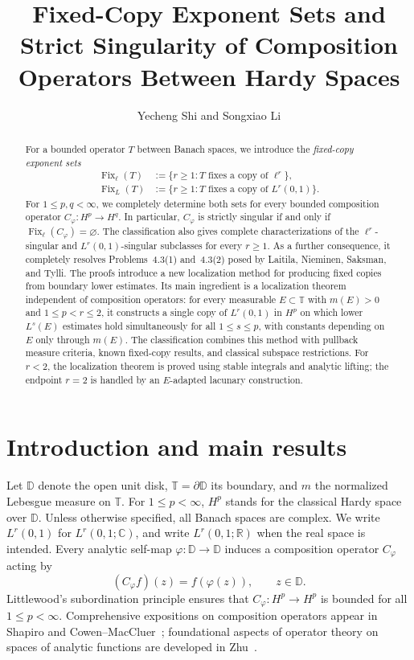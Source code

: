 \documentclass[11pt, reqno]{amsart}
\title[Fixed-Copy Exponents and Strict Singularity]
{Fixed-Copy Exponent Sets and Strict Singularity of Composition Operators Between Hardy Spaces}
\author[Y. Shi and S. Li]{Yecheng Shi and Songxiao Li}
\theoremstyle{definition}
\theoremstyle{remark}
\newcommand{\D}{\mathbb{D}}
\newcommand{\T}{\mathbb{T}}
\newcommand{\C}{\mathbb{C}}
\newcommand{\R}{\mathbb{R}}
\begin{document}
\begin{abstract}
For a bounded operator \(T\) between Banach spaces, we introduce the
\emph{fixed-copy exponent sets}
\[
\begin{aligned}
\operatorname{Fix}_{\ell}(T)
&:=
\{r\ge1:T\text{ fixes a copy of }\ell^r\},\\
\operatorname{Fix}_{L}(T)
&:=
\{r\ge1:T\text{ fixes a copy of }L^r(0,1)\}.
\end{aligned}
\]
For \(1\le p,q<\infty\), we completely determine both sets for every
bounded composition operator \(C_\varphi:H^p\to H^q\). In particular,
\(C_\varphi\) is strictly singular if and only if
\(\operatorname{Fix}_{\ell}(C_\varphi)=\varnothing\).
The classification also gives complete characterizations of the
\(\ell^r\)-singular and \(L^r(0,1)\)-singular subclasses for every
\(r\ge1\). As a further consequence, it completely resolves
Problems~4.3\textup{(1)} and~4.3\textup{(2)} posed by Laitila,
Nieminen, Saksman, and Tylli.
The proofs introduce a new localization method for producing fixed
copies from boundary lower estimates. Its main ingredient is a
localization theorem independent of composition operators: for every
measurable \(E\subset\mathbb T\) with \(m(E)>0\) and
\(1\le p<r\le2\), it constructs a single copy of \(L^r(0,1)\) in
\(H^p\) on which lower \(L^s(E)\) estimates hold simultaneously for
all \(1\le s\le p\), with constants depending on \(E\) only through
\(m(E)\). The classification combines this method with pullback
measure criteria, known fixed-copy results, and classical subspace
restrictions. For \(r<2\), the localization theorem is proved using
stable integrals and analytic lifting; the endpoint \(r=2\) is
handled by an \(E\)-adapted lacunary construction.
\end{abstract}
\maketitle

\section{Introduction and main results}
\label{sec:intro}


Let \(\D\) denote the open unit disk, \(\T=\partial\D\) its boundary,
and \(m\) the normalized Lebesgue measure on \(\T\). For $1\le p<\infty$, $H^{p}$
stands for the classical Hardy space over $\D$. 
Unless otherwise specified, all Banach spaces are complex.
We write \(L^r(0,1)\) for \(L^r(0,1;\C)\), and write
\(L^r(0,1;\R)\) when the real space is intended.
Every analytic self-map
$\varphi:\D\to\D$ induces a composition operator $C_{\varphi}$ acting by
\[
(C_{\varphi}f)(z)=f(\varphi(z)),\qquad z\in\D.
\]
Littlewood's subordination principle ensures that
$C_{\varphi}:H^{p}\to H^{p}$ is bounded for all $1\le p<\infty$.
Comprehensive expositions on composition operators appear in Shapiro \cite{Shapiro1993} 
and Cowen--MacCluer~\cite{CowenMacCluer1995}; foundational aspects of operator theory on spaces of
analytic functions are developed in Zhu~\cite{Zhu2007}.
\end{document}
